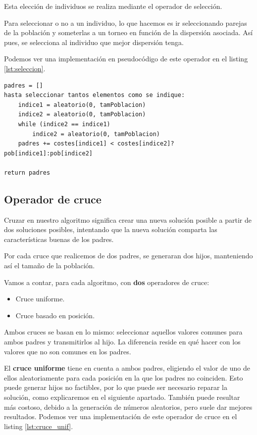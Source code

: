 Esta elección de individuos se realiza mediante el operador de selección.

Para seleccionar o no a un individuo, lo que hacemos es ir seleccionando parejas de la población y someterlas a un torneo en función de la dispersión asociada. Así pues, se selecciona al individuo que mejor dispersión tenga.

Podemos ver una implementación en pseudocódigo de este operador en el listing \ref{lst:seleccion}.

\begin{lstlisting}[frame=single, caption={Operador de selección}, captionpos=b, label=lst:seleccion]
padres = []
hasta seleccionar tantos elementos como se indique:
    indice1 = aleatorio(0, tamPoblacion)
    indice2 = aleatorio(0, tamPoblacion)
    while (indice2 == indice1)
        indice2 = aleatorio(0, tamPoblacion)
    padres += costes[indice1] < costes[indice2]?pob[indice1]:pob[indice2]

return padres
\end{lstlisting}


\subsection{Operador de cruce}

Cruzar en nuestro algoritmo significa crear una nueva solución posible a partir de dos soluciones posibles, intentando que la nueva solución comparta las características buenas de los padres.

Por cada cruce que realicemos de dos padres, se generaran dos hijos, manteniendo así el tamaño de la población.

Vamos a contar, para cada algoritmo, con \textbf{dos} operadores de cruce:

\begin{itemize}
\item Cruce uniforme.
\item Cruce basado en posición.
\end{itemize}

Ambos cruces se basan en lo mismo: seleccionar aquellos valores comunes para ambos padres y transmitirlos al hijo. La diferencia reside en qué hacer con los valores que no son comunes en los padres.

El \textbf{cruce uniforme} tiene en cuenta a ambos padres, eligiendo el valor de uno de ellos aleatoriamente para cada posición en la que los padres no coinciden.
Esto puede generar hijos no factibles, por lo que puede ser necesario reparar la solución, como explicaremos en el siguiente apartado. También puede resultar más costoso, debido a la generación de números aleatorios, pero suele dar mejores resultados. Podemos ver una implementación de este operador de cruce en el listing \ref{lst:cruce_unif}.

